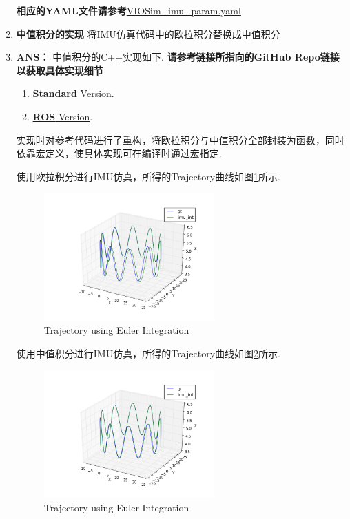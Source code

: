\documentclass[a4paper]{article}
\begin{document}
\begin{enumerate}
    \textbf{相应的YAML文件请参考}\href{https://github.com/AlexGeControl/Auto-Car-03-SLAM-00-Algorithms/blob/master/08-imu/ros/imu_utils/data/VIOSim_imu_param.yaml}{VIOSim\_imu\_param.yaml}
    
    \item[2.]{\bf 中值积分的实现}
    将IMU仿真代码中的欧拉积分替换成中值积分

    \item[$\ast$]{\bf ANS：}
    中值积分的C++实现如下. \textbf{请参考链接所指向的GitHub Repo链接以获取具体实现细节}
    \begin{enumerate}
        \item \href{https://github.com/AlexGeControl/Auto-Car-03-SLAM-00-Algorithms/blob/master/08-imu/standard/src/imu.cpp}{\textbf{Standard} Version}.
        \item \href{https://github.com/AlexGeControl/Auto-Car-03-SLAM-00-Algorithms/blob/master/08-imu/ros/vio_data_simulation/src/imu.cpp}{\textbf{ROS} Version}.
    \end{enumerate} 

    实现时对参考代码进行了重构，将欧拉积分与中值积分全部封装为函数，同时依靠宏定义，使具体实现可在编译时通过宏指定.

    使用欧拉积分进行IMU仿真，所得的Trajectory曲线如图\ref{fig:euler}所示.
    \begin{figure}[h]
        \centering
        \includegraphics[width=0.618\textwidth]{viosim-trajectory-euler}
        \caption{Trajectory using Euler Integration}
        \label{fig:euler}
    \end{figure}

    使用中值积分进行IMU仿真，所得的Trajectory曲线如图\ref{fig:midpoint}所示.
    \begin{figure}[h]
        \centering
        \includegraphics[width=0.618\textwidth]{viosim-trajectory-midpoint}
        \caption{Trajectory using Euler Integration}
        \label{fig:midpoint}
    \end{figure}
\end{enumerate}
\end{document}
